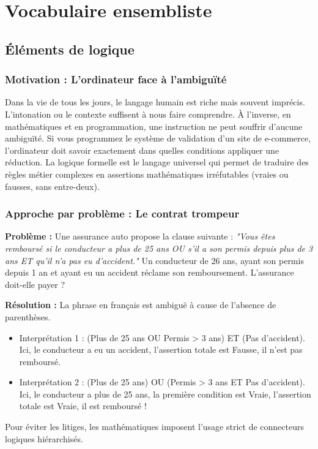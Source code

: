 \chapter{Vocabulaire ensembliste}

\section{Éléments de logique}

\subsection{Motivation : L'ordinateur face à l'ambiguïté}
Dans la vie de tous les jours, le langage humain est riche mais souvent imprécis. L'intonation ou le contexte suffisent à nous faire comprendre. À l'inverse, en mathématiques et en programmation, une instruction ne peut souffrir d'aucune ambiguïté. Si vous programmez le système de validation d'un site de e-commerce, l'ordinateur doit savoir exactement dans quelles conditions appliquer une réduction. La logique formelle est le langage universel qui permet de traduire des règles métier complexes en assertions mathématiques irréfutables (vraies ou fausses, sans entre-deux).

\subsection{Approche par problème : Le contrat trompeur}
\textbf{Problème :} Une assurance auto propose la clause suivante : \textit{"Vous êtes remboursé si le conducteur a plus de 25 ans OU s'il a son permis depuis plus de 3 ans ET qu'il n'a pas eu d'accident."} 
Un conducteur de 26 ans, ayant son permis depuis 1 an et ayant eu un accident réclame son remboursement. L'assurance doit-elle payer ?

\textbf{Résolution :} La phrase en français est ambiguë à cause de l'absence de parenthèses. 
\begin{itemize}
    \item Interprétation 1 : (Plus de 25 ans OU Permis > 3 ans) ET (Pas d'accident). Ici, le conducteur a eu un accident, l'assertion totale est Fausse, il n'est pas remboursé.
    \item Interprétation 2 : (Plus de 25 ans) OU (Permis > 3 ans ET Pas d'accident). Ici, le conducteur a plus de 25 ans, la première condition est Vraie, l'assertion totale est Vraie, il est remboursé !
\end{itemize}
Pour éviter les litiges, les mathématiques imposent l'usage strict de connecteurs logiques hiérarchisés.

